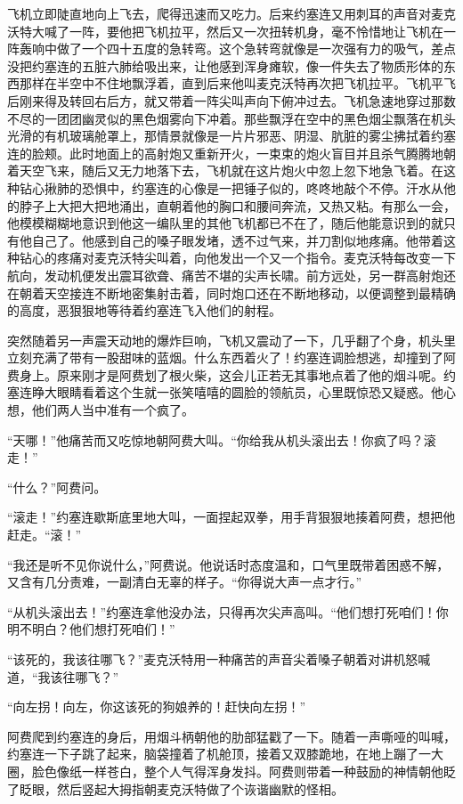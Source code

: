     飞机立即陡直地向上飞去，爬得迅速而又吃力。后来约塞连又用刺耳的声音对麦克沃特大喊了一阵，要他把飞机拉平，然后又一次扭转机身，毫不怜惜地让飞机在一阵轰响中做了一个四十五度的急转弯。这个急转弯就像是一次强有力的吸气，差点没把约塞连的五脏六肺给吸出来，让他感到浑身瘫软，像一件失去了物质形体的东西那样在半空中不住地飘浮着，直到后来他叫麦克沃特再次把飞机拉平。飞机平飞后刚来得及转回右后方，就又带着一阵尖叫声向下俯冲过去。飞机急速地穿过那数不尽的一团团幽灵似的黑色烟雾向下冲着。那些飘浮在空中的黑色烟尘飘落在机头光滑的有机玻璃舱罩上，那情景就像是一片片邪恶、阴湿、肮脏的雾尘拂拭着约塞连的脸颊。此时地面上的高射炮又重新开火，一束束的炮火盲目并且杀气腾腾地朝着天空飞来，随后又无力地落下去，飞机就在这片炮火中忽上忽下地急飞着。在这种钻心揪肺的恐惧中，约塞连的心像是一把锤子似的，咚咚地敲个不停。汗水从他的脖子上大把大把地涌出，直朝着他的胸口和腰间奔流，又热又粘。有那么一会，他模模糊糊地意识到他这一编队里的其他飞机都已不在了，随后他能意识到的就只有他自己了。他感到自己的嗓子眼发堵，透不过气来，并刀割似地疼痛。他带着这种钻心的疼痛对麦克沃特尖叫着，向他发出一个又一个指令。麦克沃特每改变一下航向，发动机便发出震耳欲聋、痛苦不堪的尖声长啸。前方远处，另一群高射炮还在朝着天空接连不断地密集射击着，同时炮口还在不断地移动，以便调整到最精确的高度，恶狠狠地等待着约塞连飞入他们的射程。

 


    突然随着另一声震天动地的爆炸巨响，飞机又震动了一下，几乎翻了个身，机头里立刻充满了带有一股甜味的蓝烟。什么东西着火了！约塞连调脸想逃，却撞到了阿费身上。原来刚才是阿费划了根火柴，这会儿正若无其事地点着了他的烟斗呢。约塞连睁大眼睛看着这个生就一张笑嘻嘻的圆脸的领航员，心里既惊恐又疑惑。他心想，他们两人当中准有一个疯了。

    “天哪！”他痛苦而又吃惊地朝阿费大叫。“你给我从机头滚出去！你疯了吗？滚走！”

    “什么？”阿费问。

    “滚走！”约塞连歇斯底里地大叫，一面捏起双拳，用手背狠狠地揍着阿费，想把他赶走。“滚！”

    “我还是听不见你说什么，”阿费说。他说话时态度温和，口气里既带着困惑不解，又含有几分责难，一副清白无辜的样子。“你得说大声一点才行。”

    “从机头滚出去！”约塞连拿他没办法，只得再次尖声高叫。“他们想打死咱们！你明不明白？他们想打死咱们！”

    “该死的，我该往哪飞？”麦克沃特用一种痛苦的声音尖着嗓子朝着对讲机怒喊道，“我该往哪飞？”

    “向左拐！向左，你这该死的狗娘养的！赶快向左拐！”

    阿费爬到约塞连的身后，用烟斗柄朝他的肋部猛戳了一下。随着一声嘶哑的叫喊，约塞连一下子跳了起来，脑袋撞着了机舱顶，接着又双膝跪地，在地上蹦了一大圈，脸色像纸一样苍白，整个人气得浑身发抖。阿费则带着一种鼓励的神情朝他眨了眨眼，然后竖起大拇指朝麦克沃特做了个诙谐幽默的怪相。

